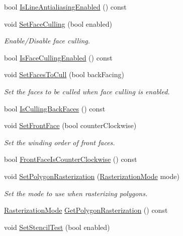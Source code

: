 \begin{DoxyCompactItemize}
bool \hyperlink{class_g_f_w_1_1_context_state_aeb3c3a071d43c86e5799562f847c432a}{Is\+Line\+Antialiasing\+Enabled} () const
\item 
void \hyperlink{class_g_f_w_1_1_context_state_a273f8e3a54f461c3bb50ba55e0ff21bd}{Set\+Face\+Culling} (bool enabled)
\begin{DoxyCompactList}\small\item\em Enable/\+Disable face culling. \end{DoxyCompactList}\item 
bool \hyperlink{class_g_f_w_1_1_context_state_a805c41d30f739fd1a92a13fabe31aad4}{Is\+Face\+Culling\+Enabled} () const
\item 
void \hyperlink{class_g_f_w_1_1_context_state_a1faffa6e3a9eb8f1974f8ed122b773b0}{Set\+Faces\+To\+Cull} (bool back\+Facing)
\begin{DoxyCompactList}\small\item\em Set the faces to be culled when face culling is enabled. \end{DoxyCompactList}\item 
bool \hyperlink{class_g_f_w_1_1_context_state_a9f16011cffc9ab8a95e2a9d88c73a097}{Is\+Culling\+Back\+Faces} () const
\item 
void \hyperlink{class_g_f_w_1_1_context_state_a16c6663de05bd0fbc054fd86f6e4ccd9}{Set\+Front\+Face} (bool counter\+Clockwise)
\begin{DoxyCompactList}\small\item\em Set the winding order of front faces. \end{DoxyCompactList}\item 
bool \hyperlink{class_g_f_w_1_1_context_state_a6e3342e574aa0a9811563f8575ed1f0f}{Front\+Face\+Is\+Counter\+Clockwise} () const
\item 
void \hyperlink{class_g_f_w_1_1_context_state_a85d785bbab573d3e336874c52aad937d}{Set\+Polygon\+Rasterization} (\hyperlink{namespace_g_f_w_a9e0ba6f593449f3060559ead1bc7e92f}{Rasterization\+Mode} mode)
\begin{DoxyCompactList}\small\item\em Set the mode to use when rasterizing polygons. \end{DoxyCompactList}\item 
\hyperlink{namespace_g_f_w_a9e0ba6f593449f3060559ead1bc7e92f}{Rasterization\+Mode} \hyperlink{class_g_f_w_1_1_context_state_ae999ededfc3a52439dad56e6979c906d}{Get\+Polygon\+Rasterization} () const
\item 
void \hyperlink{class_g_f_w_1_1_context_state_ac229c8a8ea65968a1cfb095096729fa2}{Set\+Stencil\+Test} (bool enabled)

\end{DoxyCompactItemize}
